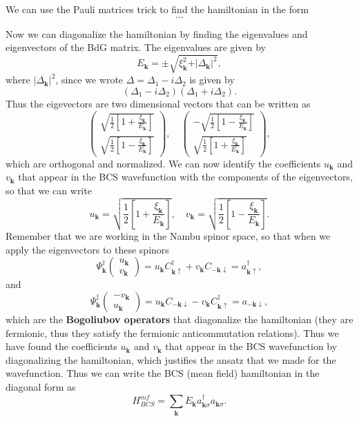 We can use the Pauli matrices trick to find the hamiltonian in the form
\[
    \dots
\]

Now we can diagonalize the hamiltonian by finding the eigenvalues and eigenvectors of the BdG matrix. The eigenvalues are given by
\[
    E_{\mathbf{k}} = \pm \sqrt{\xi_{\mathbf{k}}^2 + \vert \Delta_{\mathbf{k}} \vert^2},
\]
where \(\vert \Delta_{\mathbf{k}} \vert^2\), since we wrote \(\Delta = \Delta_1 - i \Delta_2\) is given by
\[
    (\Delta_1 - i \Delta_2)(\Delta_1 + i \Delta_2).
\]
Thus the eigevectors are two dimensional vectors that can be written as
\[
    \begin{pmatrix}
        \sqrt{\frac{1}{2}\left[ 1 + \frac{\xi_{\mathbf{k}}}{E_{\mathbf{k}}} \right]} \\
        \sqrt{\frac{1}{2}\left[ 1 - \frac{\xi_{\mathbf{k}}}{E_{\mathbf{k}}} \right]}
    \end{pmatrix}, \quad \begin{pmatrix}
        -\sqrt{\frac{1}{2}\left[ 1 - \frac{\xi_{\mathbf{k}}}{E_{\mathbf{k}}} \right]} \\
        \sqrt{\frac{1}{2}\left[ 1 + \frac{\xi_{\mathbf{k}}}{E_{\mathbf{k}}} \right]}
    \end{pmatrix},
\]
which are orthogonal and normalized. We can now identify the coefficients \(u_{\mathbf{k}}\) and \(v_{\mathbf{k}}\) that appear in the BCS wavefunction with the components of the eigenvectors, so that we can write
\[
    u_{\mathbf{k}} = \sqrt{\frac{1}{2}\left[ 1 + \frac{\xi_{\mathbf{k}}}{E_{\mathbf{k}}} \right]}, \quad v_{\mathbf{k}} = \sqrt{\frac{1}{2}\left[ 1 - \frac{\xi_{\mathbf{k}}}{E_{\mathbf{k}}} \right]}.
\]
Remember that we are working in the Nambu spinor space, so that when we apply the eigenvectors to these spinors
\[
    \Psi_{\mathbf{k}}^{\dagger} \begin{pmatrix}
        u_{\mathbf{k}} \\
        v_{\mathbf{k}}
    \end{pmatrix} = u_{\mathbf{k}} C^{\dagger}_{\mathbf{k} \uparrow} + v_{\mathbf{k}} C_{-\mathbf{k} \downarrow} = a_{\mathbf{k} \uparrow}^{\dagger},
\]
and
\[
    \Psi_{\mathbf{k}}^{\dagger} \begin{pmatrix}
        -v_{\mathbf{k}} \\
        u_{\mathbf{k}}
    \end{pmatrix} = u_{\mathbf{k}} C_{-\mathbf{k} \downarrow} - v_{\mathbf{k}} C^{\dagger}_{\mathbf{k} \uparrow} = a_{-\mathbf{k} \downarrow},
\]
which are the \textbf{Bogoliubov operators} that diagonalize the hamiltonian (they are fermionic, thus they satisfy the fermionic anticommutation relations). Thus we have found the coefficients \(u_{\mathbf{k}}\) and \(v_{\mathbf{k}}\) that appear in the BCS wavefunction by diagonalizing the hamiltonian, which justifies the ansatz that we made for the wavefunction. Thus we can write the BCS (mean field) hamiltonian in the diagonal form as
\[
    H_{BCS}^{mf} = \sum_{\mathbf{k}} E_{\mathbf{k}} a_{\mathbf{k} \sigma}^\dagger a_{\mathbf{k} \sigma}.
\]


